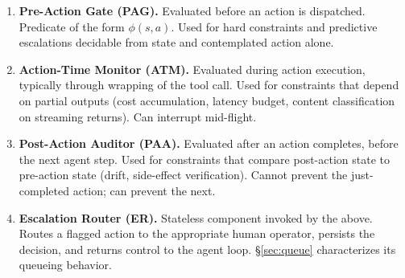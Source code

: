 \documentclass[11pt,a4paper]{article}
\theoremstyle{remark}
\begin{document}
\begin{enumerate}[leftmargin=2em,topsep=0.3em,itemsep=0.4em]
\item \textbf{Pre-Action Gate (PAG).} Evaluated before an action is dispatched. Predicate of the form $\phi(s, a)$. Used for hard constraints and predictive escalations decidable from state and contemplated action alone.

\item \textbf{Action-Time Monitor (ATM).} Evaluated during action execution, typically through wrapping of the tool call. Used for constraints that depend on partial outputs (cost accumulation, latency budget, content classification on streaming returns). Can interrupt mid-flight.

\item \textbf{Post-Action Auditor (PAA).} Evaluated after an action completes, before the next agent step. Used for constraints that compare post-action state to pre-action state (drift, side-effect verification). Cannot prevent the just-completed action; can prevent the next.

\item \textbf{Escalation Router (ER).} Stateless component invoked by the above. Routes a flagged action to the appropriate human operator, persists the decision, and returns control to the agent loop. \S\ref{sec:queue} characterizes its queueing behavior.
\end{enumerate}
\end{document}
